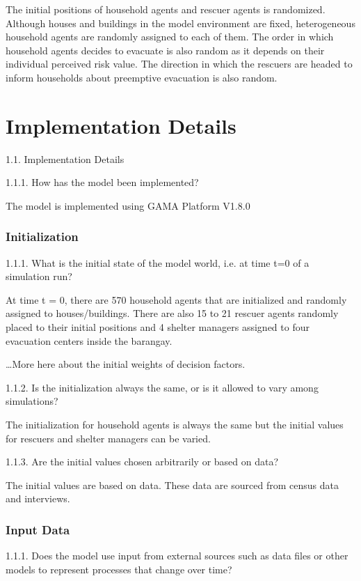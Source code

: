 \documentclass[runningheads]{llncs}
\begin{document}
The initial positions of household agents and rescuer agents is randomized. Although houses and buildings in the model environment are fixed, heterogeneous household agents are randomly assigned to each of them. The order in which household agents decides to evacuate is also random as it depends on their individual perceived risk value. The direction in which the rescuers are headed to inform households about preemptive evacuation is also random. 

\section{Implementation Details}
1.1.	Implementation Details

1.1.1.	How has the model been implemented?

The model is implemented using GAMA Platform V1.8.0

\subsubsection{Initialization}
1.1.1.	What is the initial state of the model world, i.e. at time t=0 of a simulation run?

At time t = 0, there are 570 household agents that are initialized and randomly assigned to houses/buildings. There are also 15 to 21 rescuer agents randomly placed to their initial positions and 4 shelter managers assigned to four evacuation centers inside the barangay. 

…More here about the initial weights of decision factors.

1.1.2.	Is the initialization always the same, or is it allowed to vary among simulations?

The initialization for household agents is always the same but the initial values for rescuers and shelter managers can be varied. 

1.1.3.	Are the initial values chosen arbitrarily or based on data?

The initial values are based on data. These data are sourced from census data and interviews.

\subsubsection{Input Data}

1.1.1.	Does the model use input from external sources such as data files or other models to represent processes that change over time?
\end{document}
